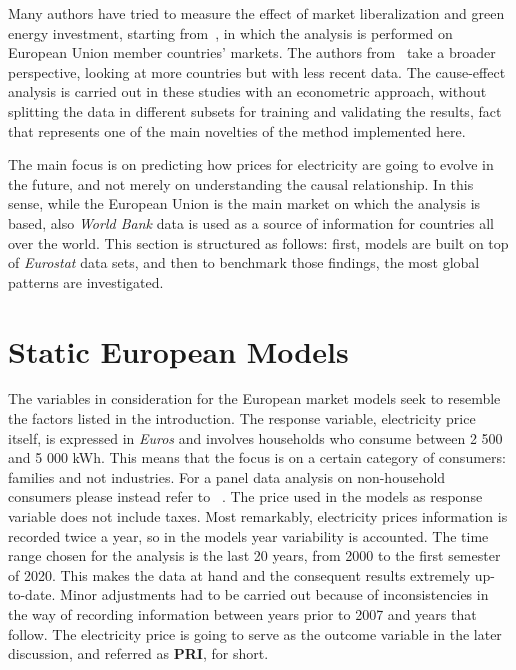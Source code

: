 \documentclass[a4paper,12pt]{book}
\begin{document}
Many authors have tried to measure the effect of market liberalization and green energy investment, starting from~\cite{moreno2012electricity}, in which the analysis  is performed on European Union member countries' markets. The authors from~\cite{nagayama2009electric} take a broader perspective, looking at more countries but with less recent data. The cause-effect analysis is carried out in these studies with an econometric approach, without splitting the data in different subsets for training and validating the results, fact that represents one of the main novelties of the method implemented here.

The main focus is on predicting how prices for electricity are going to evolve in the future, and not merely on understanding the causal relationship. In this sense, while the European Union is the main market on which the analysis is based, also \textit{World Bank} data is used as a source of information for countries all over the world. This section is structured as follows: first, models are built on top of \textit{Eurostat} data sets, and then to benchmark those findings, the most global patterns are investigated.

\section{Static European Models}

The variables in consideration for the European market models seek to resemble the factors listed in the introduction. The response variable, electricity price itself, is expressed in \textit{Euros} and involves households who consume between 2 500 and 5 000 kWh. This means that the focus is on a certain category of consumers: families and not industries. For a panel data analysis on non-household consumers please instead refer to ~\cite{del2019industrial}.  The price used in the models as response variable does not include taxes. Most remarkably, electricity prices information is recorded twice a year, so in the models year variability is accounted. The time range chosen for the analysis is the last 20 years, from 2000 to the first semester of 2020. This makes the data at hand and the consequent results extremely up-to-date. Minor adjustments had to be carried out because of inconsistencies in the way of recording information between years prior to 2007 and years that follow. The electricity price is going to serve as the outcome variable in the later discussion, and referred as \textbf{PRI}, for short.
\end{document}
